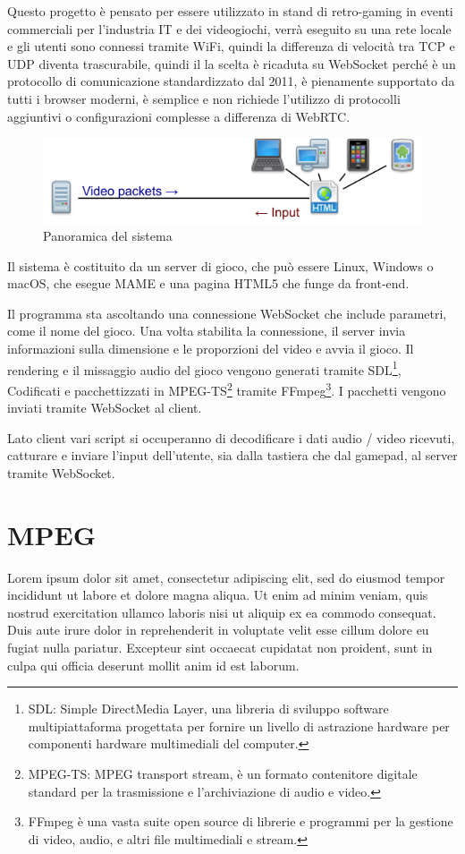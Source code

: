 Questo progetto è pensato per essere utilizzato in stand di retro-gaming in eventi commerciali per l'industria IT e dei videogiochi, verrà eseguito su una rete locale e gli utenti sono connessi tramite WiFi, quindi la differenza di velocità tra TCP e UDP diventa trascurabile, quindi il la scelta è ricaduta su WebSocket perché è un protocollo di comunicazione standardizzato dal 2011, è pienamente supportato da tutti i browser moderni, è semplice e non richiede l'utilizzo di protocolli aggiuntivi o configurazioni complesse a differenza di WebRTC.

\begin{figure}[H]
	\includegraphics[width=\linewidth]{immagini/proposed_system}
	\caption{Panoramica del sistema}
	\label{fig:proposed_system}
\end{figure}

Il sistema è costituito da un server di gioco, che può essere Linux, Windows o macOS, che esegue MAME e una pagina HTML5 che funge da front-end.

Il programma sta ascoltando una connessione WebSocket che include parametri, come il nome del gioco. Una volta stabilita la connessione, il server invia informazioni sulla dimensione e le proporzioni del video e avvia il gioco. Il rendering e il missaggio audio del gioco vengono generati tramite SDL\footnote{SDL: Simple DirectMedia Layer, una libreria di sviluppo software multipiattaforma progettata per fornire un livello di astrazione hardware per componenti hardware multimediali del computer.}, Codificati e pacchettizzati in MPEG-TS\footnote{MPEG-TS: MPEG transport stream, è un formato contenitore digitale standard per la trasmissione e l'archiviazione di audio e video.} tramite FFmpeg\footnote{FFmpeg è una vasta suite open source di librerie e programmi per la gestione di video, audio, e altri file multimediali e stream.}. I pacchetti vengono inviati tramite WebSocket al client.

Lato client vari script si occuperanno di decodificare i dati audio / video ricevuti, catturare e inviare l'input dell'utente, sia dalla tastiera che dal gamepad, al server tramite WebSocket.

\section{MPEG}
Lorem ipsum dolor sit amet, consectetur adipiscing elit, sed do eiusmod tempor incididunt ut labore et dolore magna aliqua. Ut enim ad minim veniam, quis nostrud exercitation ullamco laboris nisi ut aliquip ex ea commodo consequat. Duis aute irure dolor in reprehenderit in voluptate velit esse cillum dolore eu fugiat nulla pariatur. Excepteur sint occaecat cupidatat non proident, sunt in culpa qui officia deserunt mollit anim id est laborum.

